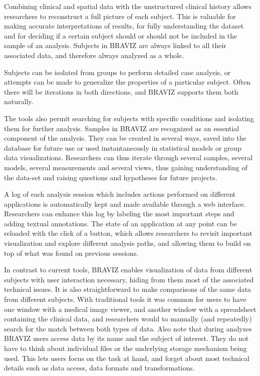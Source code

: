 \documentclass{frontiersHLTH}
\begin{document}
Combining clinical and spatial data with the unstructured clinical history allows researchers to reconstruct a full picture of each subject. This is valuable for making accurate interpretations of results, for fully understanding the dataset and for deciding if a certain subject should or should not be included in the sample of an analysis. Subjects in BRAVIZ are always linked to all their associated data, and therefore always  analyzed as a whole.

Subjects can be isolated from groups to perform detailed case analysis, or attempts can be made to generalize the properties of a particular subject. Often there will be iterations in both directions, and BRAVIZ supports them both naturally.

The tools also permit searching for subjects with specific conditions and isolating them for further analysis.
Samples in BRAVIZ are recognized as an essential component of the analysis. They can be created in several ways, saved into the database for future use or used instantaneously in statistical models or group data visualizations. Researchers can thus iterate through several samples, several models, several measurements and several views, thus gaining understanding of the data-set and raising questions and hypotheses for future projects.

A log of each analysis session which includes actions performed on different applications is automatically kept and made available through a web interface. Researchers can enhance this log by labeling the most important steps and adding textual annotations. The state of an application at any point can be reloaded with the click of a button, which allows researchers to revisit important visualization and explore different analysis paths, and allowing them to build on top of what was found on previous sessions. 

In contrast to current tools, BRAVIZ enables visualization of data from different subjects with user interaction necessary, hiding from them most of the associated technical issues. It is also straightforward to make comparisons of the same data from different subjects. With traditional tools it was common for users to have one window with a medical image viewer, and another window with a spreadsheet containing the clinical data, and researchers would to manually (and repeatedly) search for the match between both types of data. Also note that during analyzes BRAVIZ users access data by its name and the subject of interest. They do not have to think about individual files or  the underlying storage mechanism being used. This lets users focus on the task at hand, and forget about most technical details such as data access, data formats and transformations. 
\end{document}

